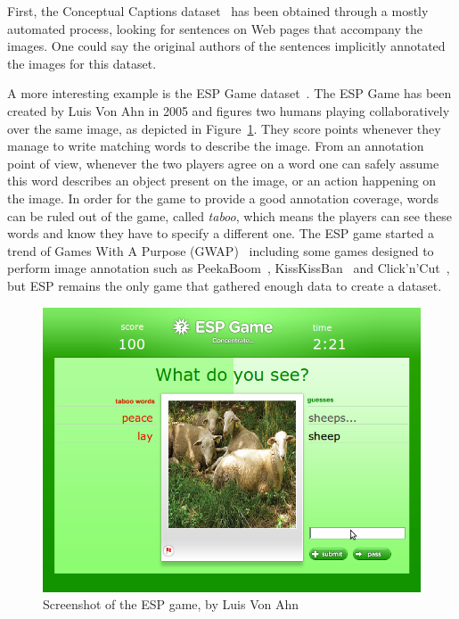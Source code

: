 First, the Conceptual Captions dataset~\cite{sharma-etal-2018-conceptual}
has been obtained through a mostly automated process,
looking for sentences on Web pages that accompany the images.
One could say the original authors of the sentences
implicitly annotated the images for this dataset.


A more interesting example is the ESP Game dataset~\cite{von2005esp}.
The ESP Game has been created by Luis Von Ahn in 2005
and figures two humans playing collaboratively over the same image,
as depicted in Figure~\ref{fig:esp}.
They score points whenever they manage to write matching words to describe the image.
From an annotation point of view, whenever the two players agree
on a word one can safely assume this word describes an object present on the image,
or an action happening on the image.
In order for the game to provide a good annotation coverage,
words can be ruled out of the game, called \textit{taboo},
which means the players can see these words and know they have to specify a different one.
The ESP game started a trend of Games With A Purpose (GWAP)~\cite{von2008designing}
including some games designed to perform image annotation
such as PeekaBoom~\cite{von2006peekaboom}, KissKissBan~\cite{ho2010kisskissban}
and Click'n'Cut~\cite{carlier2014click},
but ESP remains the only game that gathered enough data to create a dataset.

\begin{figure}[ht]
\centering
\includegraphics[width=0.5\columnwidth]{assets/img/esp.png}
\caption{Screenshot of the ESP game, by Luis Von Ahn~\cite{von2005esp}}%
\label{fig:esp}
\end{figure}

